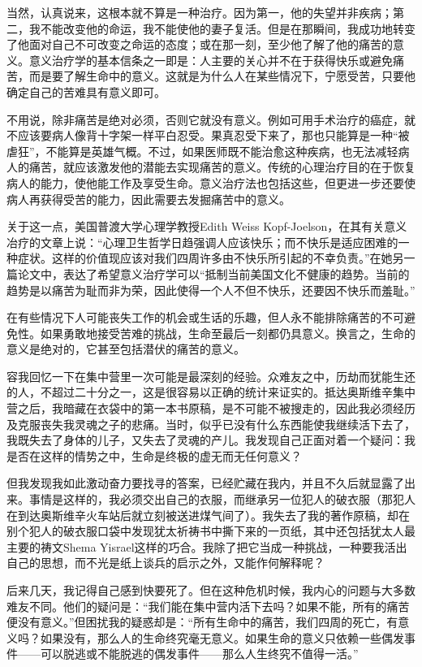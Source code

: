 \documentclass[11pt,oneside]{book}
\begin{document}
\begin{common-format}
当然，认真说来，这根本就不算是一种治疗。因为第一，他的失望并非疾病；第二，我不能改变他的命运，我不能使他的妻子复活。但是在那瞬间，我成功地转变了他面对自己不可改变之命运的态度；或在那一刻，至少他了解了他的痛苦的意义。意义治疗学的基本信条之一即是：人主要的关心并不在于获得快乐或避免痛苦，而是要了解生命中的意义。这就是为什么人在某些情况下，宁愿受苦，只要他确定自己的苦难具有意义即可。

不用说，除非痛苦是绝对必须，否则它就没有意义。例如可用手术治疗的癌症，就不应该要病人像背十字架一样平白忍受。果真忍受下来了，那也只能算是一种“被虐狂”，不能算是英雄气概。不过，如果医师既不能治愈这种疾病，也无法减轻病人的痛苦，就应该激发他的潜能去实现痛苦的意义。传统的心理治疗目的在于恢复病人的能力，使他能工作及享受生命。意义治疗法也包括这些，但更进一步还要使病人再获得受苦的能力，因此需要去发掘痛苦中的意义。

关于这一点，美国普渡大学心理学教授Edith Weiss Kopf-Joelson，在其有关意义冶疗的文章上说：“心理卫生哲学日趋强调人应该快乐；而不快乐是适应困难的一种症状。这样的价值现应该对我们四周许多由不快乐所引起的不幸负责。”在她另一篇论文中，表达了希望意义治疗学可以“抵制当前美国文化不健康的趋势。当前的趋势是以痛苦为耻而非为荣，因此使得一个人不但不快乐，还要因不快乐而羞耻。”

在有些情况下人可能丧失工作的机会或生话的乐趣，但人永不能排除痛苦的不可避免性。如果勇敢地接受苦难的挑战，生命至最后一刻都仍具意义。换言之，生命的意义是绝对的，它甚至包括潜伏的痛苦的意义。

容我回忆一下在集中营里一次可能是最深刻的经验。众难友之中，历劫而犹能生还的人，不超过二十分之一，这是很容易以正确的统计来证实的。抵达奥斯维辛集中营之后，我暗藏在衣袋中的第一本书原稿，是不可能不被搜走的，因此我必须经历及克服丧失我灵魂之子的悲痛。当时，似乎已没有什么东西能使我继续活下去了，我既失去了身体的儿子，又失去了灵魂的产儿。我发现自己正面对着一个疑问：我是否在这样的情势之中，生命是终极的虚无而无任何意义？

但我发现我如此激动奋力要找寻的答案，已经贮藏在我内，并且不久后就显露了出来。事情是这样的，我必须交出自己的衣服，而继承另一位犯人的破衣服（那犯人在到达奥斯维辛火车站后就立刻被送进煤气间了）。我失去了我的著作原稿，却在别个犯人的破衣服口袋中发现犹太祈祷书中撕下来的一页纸，其中还包括犹太人最主要的祷文Shema Yisrael这样的巧合。我除了把它当成一种挑战，一种要我活出自己的思想，而不光是纸上谈兵的启示之外，又能作何解释呢？

后来几天，我记得自己感到快要死了。但在这种危机时候，我内心的问题与大多数难友不同。他们的疑问是：“我们能在集中营内活下去吗？如果不能，所有的痛苦便没有意义。”但困扰我的疑惑却是：“所有生命中的痛苦，我们四周的死亡，有意义吗？如果没有，那么人的生命终究毫无意义。如果生命的意义只依赖一些偶发事件——可以脱逃或不能脱逃的偶发事件——那么人生终究不值得一活。”



\end{common-format}
\end{document}
